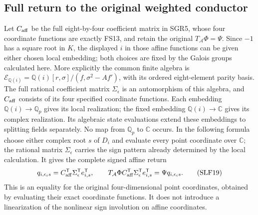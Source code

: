 \documentclass[11pt]{article}
\begin{document}
\subsection{Full return to the original weighted conductor}
Let $C_{\rm aff}$ be the full eight-by-four coefficient matrix in
SGR5, whose four coordinate functions are exactly FS13, and retain
the original $T_{\mathcal A}\Phi=\Psi$. Since $-1$ has a square
root in $K$, the displayed $i$ in those affine functions can be
given either chosen local embedding; both choices are fixed by the
Galois groups calculated here. More explicitly the common finite
algebra is
$\mathscr E_{\mathbb Q(i)}=\mathbb Q(i)[r,\sigma]/(f,\sigma^2-Af')$,
with its ordered eight-element parity basis. The full rational
coefficient matrix $\Sigma_\epsilon$ is an automorphism of this
algebra, and $C_{\rm aff}$ consists of its four specified coordinate
functions. Each embedding $\mathbb Q(i)\to\mathbb Q_p$ gives its
local realization; the fixed embedding $\mathbb Q(i)\to\mathbb C$
gives its complex realization. Its algebraic state evaluations
extend these embeddings to splitting fields separately. No map
from $\mathbb Q_p$ to $\mathbb C$ occurs. In the following formula choose either complex root
$s$ of $D_i$ and evaluate every point coordinate over $\mathbb C$;
the rational matrix $\Sigma_\epsilon$ carries the sign pattern
already determined by the local calculation. It gives the complete
signed affine return
\[
 q_{i,\epsilon_i s}
   =C_{\rm aff}^{\mathsf T}\Sigma_\epsilon^{\mathsf T}e_{i,s}^{\mathsf T},
 \qquad
 T_{\mathcal A}\Phi C_{\rm aff}^{\mathsf T}
       \Sigma_\epsilon^{\mathsf T}e_{i,s}^{\mathsf T}
    =\Psi q_{i,\epsilon_i s}.                         \tag{SLF19}
\]
This is an equality for the original four-dimensional point
coordinates, obtained by evaluating their exact coordinate
functions. It does not introduce a linearization of the nonlinear
sign involution on affine coordinates.
\end{document}

